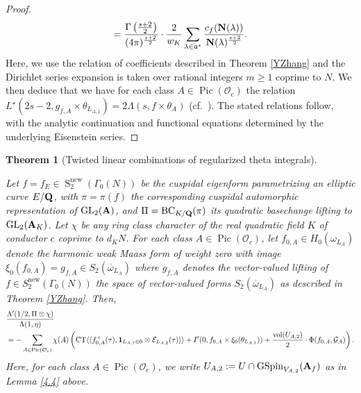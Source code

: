 \documentclass{amsart}
\newtheorem{theorem}{Theorem}[section]
\theoremstyle{definition}
\begin{document}
\begin{proof}
\begin{equation*}
\begin{aligned}
=  \frac{ \Gamma \left( \frac{s +2}{2} \right)  }{ (4 \pi)^{ \frac{s+2}{2}  }   } \cdot \frac{2}{w_K} \sum\limits_{\lambda \in \mathfrak{a}^{\star}} 
\frac{ c_f ( {\bf{N}}(\lambda) ) }{ {\bf{N}}(\lambda)^{ \frac{s+2}{2} }  }. \end{aligned}\end{equation*}
Here, we use the relation of coefficients described in Theorem \ref{YZhang} and the Dirichlet 
series expansion is taken over rational integers $m \geq 1$ coprime to $N$.
We then deduce that we have for each class $A \in \operatorname{Pic}(\mathcal{O}_c)$ the relation 
$L^{\star}(2s-2, g_{f, A} \times \theta_{L_{A, 1}}) = 2 \Lambda(s, f \times \theta_A)$ (cf.~\cite[$\S$ IV (0.1), p.~271]{GZ}). 
The stated relations follow, with the analytic continuation and functional equations determined by the underlying Eisenstein series. \end{proof}

\begin{theorem}[Twisted linear combinations of regularized theta integrals]\label{MAIN}

Let $f = f_E \in \operatorname{S}_2^{\operatorname{new}}(\Gamma_0(N))$ be the cuspidal eigenform 
parametrizing an elliptic curve $E/{\bf{Q}}$, with $\pi = \pi(f)$ the corresponding cuspidal automorphic representation of $\operatorname{GL}_2({\bf{A}})$,
and $\Pi = \operatorname{BC}_{K/{\bf{Q}}}(\pi)$ its quadratic basechange lifting to $\operatorname{GL}_2({\bf{A}}_K)$. 
Let $\chi$ be any ring class character of the real quadratic field $K$ of conductor $c$ coprime to $d_K N$. 
For each class $A \in \operatorname{Pic}(\mathcal{O}_c)$, let $f_{0, A} \in H_{0}(\omega_{L_A})$ 
denote the harmonic weak Maass form of weight zero with image $\xi_0(f_{0, A}) = g_{f, A} \in S_{2}(\overline{\omega}_{L_A})$ 
where $g_{f, A}$ denotes the vector-valued lifting of $f \in S_2^{\operatorname{new}}(\Gamma_0(N))$
the space of vector-valued forms $S_{2}(\overline{\omega}_{L_A})$ as described in Theorem \ref{YZhang}. Then, 
\begin{align*} &\frac{\Lambda'(1/2, \Pi \otimes \chi)}{\Lambda(1, \eta)} \\ 
&=  - \sum\limits_{A \in \operatorname{Pic}(\mathcal{O}_c)} \chi(A) 
\left(   \operatorname{CT} \langle \langle f_{0, A}^+(\tau), {\bf{1}}_{L_{A,1} \oplus 0} \otimes \mathcal{E}_{L_{A,2}}(\tau) \rangle \rangle
+I'(0, f_{0, A} \times \xi_0(\theta_{L_{A,1}}))
+  \frac{\operatorname{vol}(U_{A, 2})}{2} \cdot \Phi( f_{0,A}, \mathcal{G}_A) \right). \end{align*}
Here, for each class $A \in \operatorname{Pic}(\mathcal{O}_c)$, we write 
$U_{A, 2} := U \cap \operatorname{GSpin}_{V_{A, 2}}({\bf{A}}_f)$ as in Lemma \ref{4.4} above.

\end{theorem} 
\end{document}
